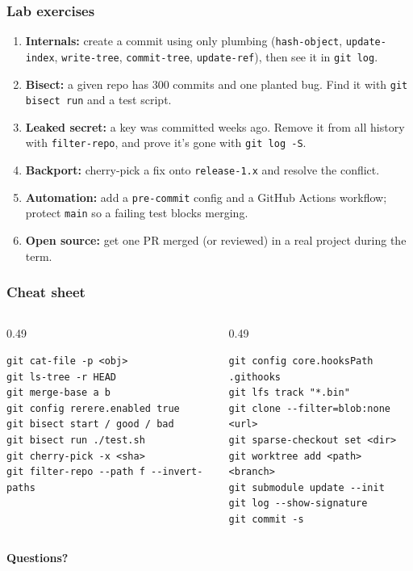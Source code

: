 \documentclass[aspectratio=169,10pt,compress]{beamer}
\newcommand{\cmd}[1]{\texttt{\color{gitred}#1}}
\begin{document}
\begin{frame}[t,fragile] \frametitle{Lab exercises}
  \begin{enumerate}\small
    \item \textbf{Internals:} create a commit using only plumbing
          (\cmd{hash-object}, \cmd{update-index}, \cmd{write-tree}, \cmd{commit-tree},
          \cmd{update-ref}), then see it in \cmd{git log}.
    \item \textbf{Bisect:} a given repo has 300 commits and one planted bug.
          Find it with \cmd{git bisect run} and a test script.
    \item \textbf{Leaked secret:} a key was committed weeks ago. Remove it from all
          history with \texttt{filter-repo}, and prove it's gone with \cmd{git log -S}.
    \item \textbf{Backport:} cherry-pick a fix onto \texttt{release-1.x} and resolve the conflict.
    \item \textbf{Automation:} add a \texttt{pre-commit} config and a GitHub Actions
          workflow; protect \texttt{main} so a failing test blocks merging.
    \item \textbf{Open source:} get one PR merged (or reviewed) in a real project during the term.
  \end{enumerate}
\end{frame}

\begin{frame}[t,fragile] \frametitle{Cheat sheet}
  \begin{columns}[T]
    \begin{column}{0.49\textwidth}
\begin{lstlisting}
git cat-file -p <obj>
git ls-tree -r HEAD
git merge-base a b
git config rerere.enabled true
git bisect start / good / bad
git bisect run ./test.sh
git cherry-pick -x <sha>
git filter-repo --path f --invert-paths
\end{lstlisting}
    \end{column}
    \begin{column}{0.49\textwidth}
\begin{lstlisting}
git config core.hooksPath .githooks
git lfs track "*.bin"
git clone --filter=blob:none <url>
git sparse-checkout set <dir>
git worktree add <path> <branch>
git submodule update --init
git log --show-signature
git commit -s
\end{lstlisting}
    \end{column}
  \end{columns}

  \vspace{1em}
  \begin{center}
    {\Large \textbf{Questions?}}
  \end{center}
\end{frame}
\end{document}
